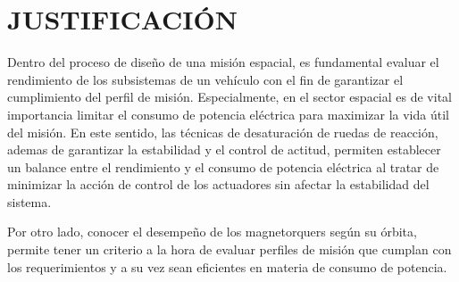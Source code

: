 \newpage


\section{JUSTIFICACIÓN}

 
%
%
%

Dentro del proceso de diseño de una misión espacial, es fundamental evaluar el rendimiento de los subsistemas de un vehículo con el fin de garantizar el cumplimiento del perfil de misión. Especialmente, en el sector espacial es de vital importancia limitar el consumo de potencia eléctrica para maximizar la vida útil del misión. En este sentido, las técnicas de desaturación de ruedas de reacción, ademas de garantizar la estabilidad y el control de actitud, permiten establecer un balance entre el rendimiento y el consumo de potencia eléctrica al tratar de minimizar la acción de control de los actuadores sin afectar la estabilidad del sistema.

Por otro lado, conocer el desempeño de los magnetorquers según su órbita, permite tener un criterio a la hora de evaluar perfiles de misión que cumplan con los requerimientos y a su vez sean eficientes en materia de consumo de potencia. 

